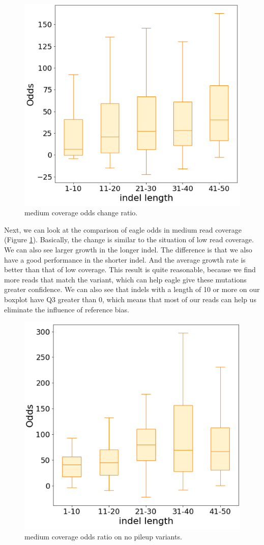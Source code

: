 \begin{figure}[H]
    \centering
    \includegraphics[width=0.6\columnwidth]{body/image/4-10.png}
    \captionsetup{labelfont=bf}
    \renewcommand{\baselinestretch}{1.0}
    \caption[medium coverage odds change ratio]{medium coverage odds change ratio.}
    \label{f4-10}
\end{figure}

Next, we can look at the comparison of eagle odds in medium read coverage (Figure \ref{f4-10}). Basically, the change is similar to the situation of low read coverage. We can also see larger growth in the longer indel. The difference is that we also have a good performance in the shorter indel. And the average growth rate is better than that of low coverage. This result is quite reasonable, because we find more reads that match the variant, which can help eagle give these mutations greater confidence.
We can also see that indels with a length of 10 or more on our boxplot have Q3 greater than 0, which means that most of our reads can help us eliminate the influence of reference bias.

\begin{figure}[H]
    \centering
    \includegraphics[width=0.6\columnwidth]{body/image/4-11.png}
    \captionsetup{labelfont=bf}
    \renewcommand{\baselinestretch}{1.0}
    \caption[medium coverage variants odds]{medium coverage odds ratio on no pileup variants.}
    \label{f4-11}
\end{figure}


